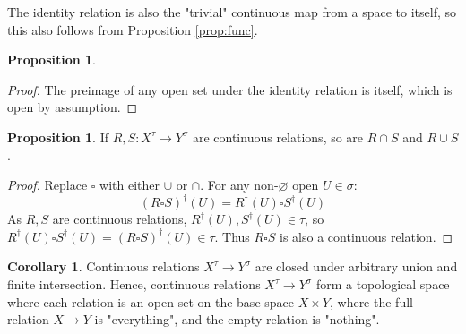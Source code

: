 \documentclass{tufte-handout}
\theoremstyle{definition}
\newtheorem{corollary}[theorem]{Corollary}
\newtheorem{proposition}[theorem]{Proposition}
\newtheorem{rem}[theorem]{Reminder}
\begin{document}
The identity relation is also the "trivial" continuous map from a space to itself, so this also follows from Proposition \ref{prop:func}.
\begin{proposition}\label{prop:idrel}
\begin{proof}
The preimage of any open set under the identity relation is itself, which is open by assumption.
\end{proof}
\end{proposition}


\begin{proposition}
If $R,S: X^\tau \rightarrow Y^\sigma$ are continuous relations, so are $R \cap S$ and $R \cup S$.
\begin{proof}
Replace $\square$ with either $\cup$ or $\cap$. For any non-$\varnothing$ open $U \in \sigma$: \[(R \square S)^\dag (U) = R^\dag(U) \square S^\dag(U)\] As $R,S$ are continuous relations, $R^\dag(U),S^\dag(U) \in \tau$, so $R^\dag(U) \square S^\dag(U) = (R \square S)^\dag (U) \in \tau$. Thus $R\square S$ is also a continuous relation.
\end{proof}
\end{proposition}

\begin{corollary}\label{cor:homspace}
Continuous relations $X^\tau \rightarrow Y^\sigma$ are closed under arbitrary union and finite intersection. Hence, continuous relations $X^\tau \rightarrow Y^\sigma$ form a topological space where each relation is an open set on the base space $X \times Y$, where the full relation $X \rightarrow Y$ is "everything", and the empty relation is "nothing".
\end{corollary}
\end{document}
